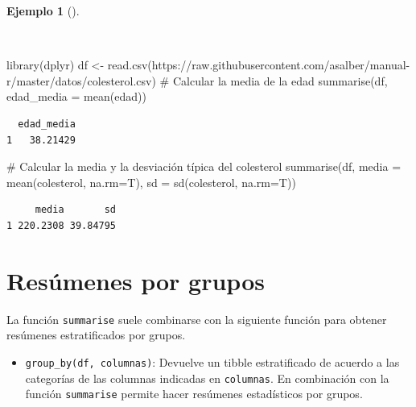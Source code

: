 \documentclass[
  spanish,
  a4paper,
]{scrreport}
\newenvironment{Shaded}{\begin{snugshade}}{\end{snugshade}}
\newcommand{\AttributeTok}[1]{\textcolor[rgb]{0.40,0.45,0.13}{#1}}
\newcommand{\CommentTok}[1]{\textcolor[rgb]{0.37,0.37,0.37}{#1}}
\newcommand{\FunctionTok}[1]{\textcolor[rgb]{0.28,0.35,0.67}{#1}}
\newcommand{\NormalTok}[1]{\textcolor[rgb]{0.00,0.23,0.31}{#1}}
\newcommand{\OtherTok}[1]{\textcolor[rgb]{0.00,0.23,0.31}{#1}}
\newcommand{\StringTok}[1]{\textcolor[rgb]{0.13,0.47,0.30}{#1}}
\providecommand{\tightlist}{%
  \setlength{\itemsep}{0pt}\setlength{\parskip}{0pt}}
\theoremstyle{definition}
\theoremstyle{definition}
\newtheorem{example}{Ejemplo}[chapter]
\theoremstyle{remark}
\begin{document}
\begin{example}[]\protect\hypertarget{exm-sumarise}{}\label{exm-sumarise}

~

\begin{Shaded}
\begin{Highlighting}[]
\FunctionTok{library}\NormalTok{(dplyr)}
\NormalTok{df }\OtherTok{\textless{}{-}} \FunctionTok{read.csv}\NormalTok{(}\StringTok{\textquotesingle{}https://raw.githubusercontent.com/asalber/manual{-}r/master/datos/colesterol.csv\textquotesingle{}}\NormalTok{)}
\CommentTok{\# Calcular la media de la edad}
\FunctionTok{summarise}\NormalTok{(df, }\AttributeTok{edad\_media =} \FunctionTok{mean}\NormalTok{(edad))}
\end{Highlighting}
\end{Shaded}

\begin{verbatim}
  edad_media
1   38.21429
\end{verbatim}

\begin{Shaded}
\begin{Highlighting}[]
\CommentTok{\# Calcular la media y la desviación típica del colesterol}
\FunctionTok{summarise}\NormalTok{(df, }\AttributeTok{media =} \FunctionTok{mean}\NormalTok{(colesterol, }\AttributeTok{na.rm=}\NormalTok{T), }\AttributeTok{sd =} \FunctionTok{sd}\NormalTok{(colesterol, }\AttributeTok{na.rm=}\NormalTok{T))}
\end{Highlighting}
\end{Shaded}

\begin{verbatim}
     media       sd
1 220.2308 39.84795
\end{verbatim}

\end{example}

\section{Resúmenes por grupos}\label{resuxfamenes-por-grupos}

La función \texttt{summarise} suele combinarse con la siguiente función
para obtener resúmenes estratificados por grupos.

\begin{itemize}
\tightlist
\item
  \texttt{group\_by(df,\ columnas)}: Devuelve un tibble estratificado de
  acuerdo a las categorías de las columnas indicadas en
  \texttt{columnas}. En combinación con la función \texttt{summarise}
  permite hacer resúmenes estadísticos por grupos.
\end{itemize}
\end{document}
